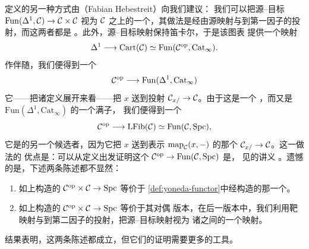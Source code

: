 \begin{remark}\label{rem:hebestreit-yoneda}
定义\trBivariant{}\trMappingSpace{}\trFunctor{}的另一种方式由\trHebestreit{}（Fabian Hebestreit）向我们建议：
我们可以把源--目标\trFunctor{} $\mathrm{Fun}(\Delta^1, \mathcal{C}) \to \mathcal{C} \times \mathcal{C}$ 视为
$\mathcal{C}$ 之上的一个\trFunctor{}，其做法是经由源映射与到第一因子的投射，而这两者都是%
\trCartesianFibration{}。此外，源--目标映射保持笛卡尔\trMorphism{}，于是该图表
提供一个映射
\[
\Delta^1 \longrightarrow \mathrm{Cart}(\mathcal{C})
  \simeq \mathrm{Fun}(\mathcal{C}^{\mathrm{op}}, \mathrm{Cat}_\infty).
\]
作伴随，我们便得到一个\trFunctor{}%
\[
\mathcal{C}^{\mathrm{op}} \longrightarrow \mathrm{Fun}(\Delta^1, \mathrm{Cat}_\infty)
\]
它——把诸定义展开来看——把 $x$ 送到投射\trFunctor{} $\mathcal{C}_{x/} \to \mathcal{C}$。由于这是一个%
\trLeftFibration{}，而\trLeftFibration{}又是
$\mathrm{Fun}(\Delta^1, \mathrm{Cat}_\infty)$ 的一个满子\trCategory{}，
我们便得到一个\trFunctor{}%
\[
\mathcal{C}^{\mathrm{op}} \longrightarrow \mathrm{LFib}(\mathcal{C})
  \simeq \mathrm{Fun}(\mathcal{C}, \mathrm{Spc}),
\]
它是\trYoneda{}\trFunctor{}的另一个候选者，因为它把 $x$ 送到表示\trFunctor{}%
$\mathrm{map}_{\mathcal{C}}(x, -)$ 的那个\trLeftFibration{} $\mathcal{C}_{x/} \to \mathcal{C}$。这一做法的
优点是：可以从定义出发证明这个\trYoneda{}\trFunctor{}%
$\mathcal{C}^{\mathrm{op}} \to \mathrm{Fun}(\mathcal{C}, \mathrm{Spc})$ 是\trFullyFaithful{}，
见\trHebestreit{}的讲义
\cite[Yoneda's lemma, adjunctions, and (co)limits]{Heb20}。遗憾的是，下述两条陈述都不显然：
\begin{enumerate}[label=(\arabic*)]
  \item 如上构造的\trFunctor{} $\mathcal{C}^{\mathrm{op}} \times \mathcal{C} \to \mathrm{Spc}$ 等价于%
        \cref{def:yoneda-functor}中经\trTwistedArrowCategory{}构造的那一个。
  \item 如上构造的\trFunctor{} $\mathcal{C}^{\mathrm{op}} \times \mathcal{C} \to \mathrm{Spc}$ 等价于其对偶
        版本，在后一版本中，我们利用靶映射与到第二因子的投射，把源--目标映射视为
        诸\trCocartesianFibration{}之间的一个映射。
\end{enumerate}
结果表明，这两条陈述都成立，但它们的证明需要更多的工具。
\end{remark}
